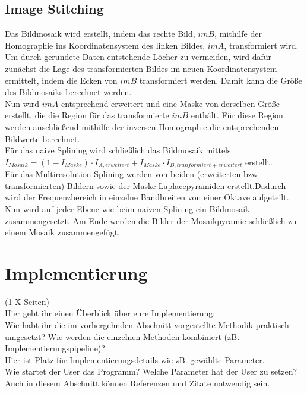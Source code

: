 \documentclass[deutsch]{scrartcl}
\begin{document}
\subsection{Image Stitching}
Das Bildmosaik wird erstellt, indem das rechte Bild, $imB$, mithilfe der Homographie ins Koordinatensystem des linken Bildes, $imA$, transformiert wird. Um durch gerundete Daten entstehende Löcher zu vermeiden, wird dafür zunächst die Lage des transformierten Bildes im neuen Koordinatensystem ermittelt, indem die Ecken von $imB$ transformiert werden. Damit kann die Größe des Bildmosaiks berechnet werden.\\
Nun wird $imA$ entsprechend erweitert und eine Maske von derselben Größe erstellt, die die Region für das transformierte $imB$ enthält. Für diese Region werden anschließend mithilfe der inversen Homographie die entsprechenden Bildwerte berechnet. \\
Für das naive Splining wird schließlich das Bildmosaik mittels $I_{Mosaik}=(1-I_{Maske})\cdot I_{A,erweitert} + I_{Maske}\cdot I_{B,tranformiert+erweitert}$ erstellt. \\
Für das Multiresolution Splining\cite{spline83} werden von beiden (erweiterten bzw transformierten) Bildern sowie der Maske Laplacepyramiden erstellt.Dadurch wird der Frequenzbereich in einzelne Bandbreiten von einer Oktave aufgeteilt. Nun wird auf jeder Ebene wie beim naiven Splining ein Bildmosaik zusammengesetzt. Am Ende werden die Bilder der Mosaikpyramie schließlich zu einem Mosaik zusammengefügt.


\newpage
\section{Implementierung}
(1-X Seiten)\\
Hier gebt ihr einen Überblick über eure Implementierung:\\
Wie habt ihr die im vorhergehnden Abschnitt vorgestellte Methodik praktisch umgesetzt? Wie werden die einzelnen Methoden kombiniert (zB. Implementierungspipeline)?\\
Hier ist Platz für Implementierungsdetails wie zB. gewählte Parameter. \\
Wie startet der User das Programm? Welche Parameter hat der User zu setzen?\\
Auch in diesem Abschnitt können Referenzen und Zitate notwendig sein.\\
\end{document}
